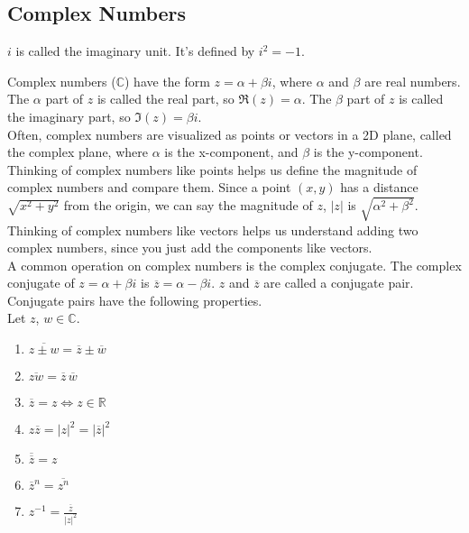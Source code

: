 \subsection{Complex Numbers}
\begin{definition}
	$i$ is called the imaginary unit. It's defined by $i^2 = -1$.
\end{definition}



Complex numbers ($\mathbb{C}$) have the form $z = \alpha + \beta i$, where $\alpha$ and $\beta$ are real numbers. The $\alpha$ part of $z$ is called the real part, so $\Re(z) = \alpha$. The $\beta$ part of $z$ is called the imaginary part, so $\Im(z) = \beta i$.\\


Often, complex numbers are visualized as points or vectors in a 2D plane, called the complex plane, where $\alpha$ is the x-component, and $\beta$ is the y-component. Thinking of complex numbers like points helps us define the magnitude of complex numbers and compare them. Since a point $(x,y)$ has a distance $\sqrt{x^2+y^2}$ from the origin, we can say the magnitude of $z$, $\lvert z \rvert$ is $\sqrt{\alpha^2 + \beta^2}$. Thinking of complex numbers like vectors helps us understand adding two complex numbers, since you just add the components like vectors.\\


A common operation on complex numbers is the complex conjugate. The complex conjugate of $z = \alpha + \beta i$ is $\overline{z} = \alpha - \beta i$. $z$ and $\overline{z}$ are called a conjugate pair.\\


Conjugate pairs have the following properties.
\\Let $z$, $w \in \mathbb{C}$.
\begin{enumerate}[label=]
	\item $\overline{z \pm w} = \overline{z} \pm \overline{w}$
	\item $\overline{zw}=\overline{z}\hspace{2pt}\overline{w}$
	\item $\overline{z}=z \Leftrightarrow z \in \mathbb{R}$
	\item $z\overline{z} = \lvert z \rvert^2 = \lvert \overline{z} \rvert^2$
	\item $\overline{\overline{z}} = z$
	\item $\overline{z}^n = \overline{z^n}$
	\item $z^{-1} = \frac{\overline{z}}{\lvert z \rvert^2}$
\end{enumerate}